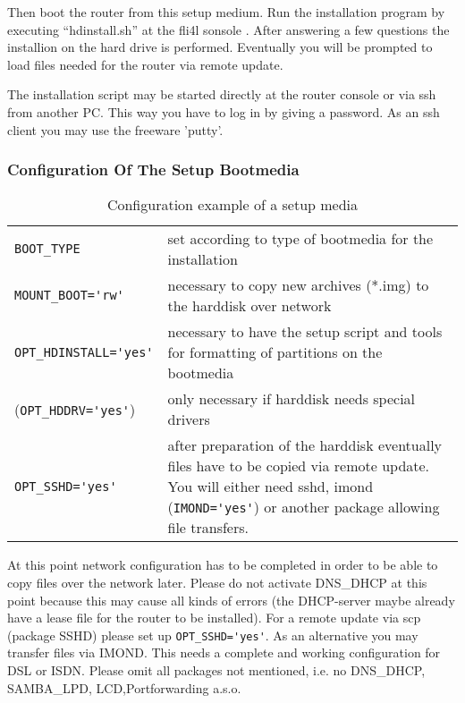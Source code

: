     Then boot the router from this setup medium. Run the installation program by 
    executing ``hdinstall.sh'' at the fli4l sonsole . After answering a few questions
    the installion on the hard drive is performed. Eventually you will be prompted to 
    load files needed for the router via remote update.

    
    The installation script may be started directly at the router console or via ssh 
    from another PC. This way you have to log in by giving a password. As an ssh client
    you may use the freeware 'putty'.

\subsubsection{Configuration Of The Setup Bootmedia}

\begin{table}[htb]
  \begin{center}
    \begin{small}
    \begin{tabular}[h!]{lp{9cm}}
    \verb*?BOOT_TYPE? & set according to type of bootmedia for the installation\\
    \verb*?MOUNT_BOOT='rw'? & necessary to copy new archives (*.img) to the harddisk
        over network\\
    \verb*?OPT_HDINSTALL='yes'? & necessary to have the setup script and tools for  
        formatting of partitions on the bootmedia\\
    (\verb*?OPT_HDDRV='yes'?) & only necessary if harddisk needs special drivers\\
    \verb*?OPT_SSHD='yes'? & after preparation of the harddisk eventually files 
        have to be copied via remote update. You will either need sshd, imond 
        (\verb*?IMOND='yes'?) or another package allowing file transfers. 
    \end{tabular}
    \end{small}
    \caption{Configuration example of a setup media}
  \end{center}
\end{table}

    At this point network configuration has to be completed in order to be able to copy 
    files over the network later. Please do not activate DNS\_DHCP at this point because 
    this may cause all kinds of errors (the DHCP-server maybe already have a lease file for 
    the router to be installed). For a remote update via scp (package SSHD) please set up
    \verb*?OPT_SSHD='yes'?. As an alternative you may transfer files via IMOND. This needs 
    a complete and working configuration for DSL or ISDN. Please omit all packages not 
    mentioned, i.e. no  DNS\_DHCP, SAMBA\_LPD, LCD,Portforwarding a.s.o.\\


